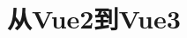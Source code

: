 \documentclass[openany]{book}
\begin{document}
\maketitle
\tableofcontents
% 
\part{从Vue2到Vue3}

\end{document}
